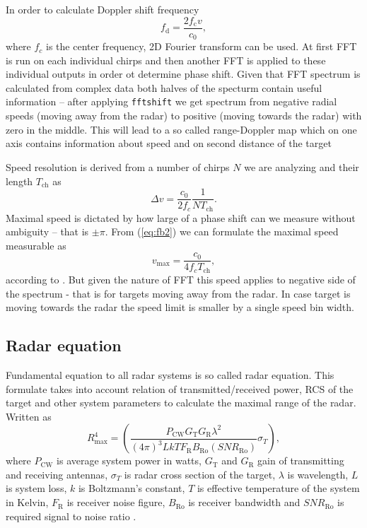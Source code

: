 In order to calculate Doppler shift frequency
\begin{equation}
  f_\mathrm{d} = \frac{2f_\mathrm{c}v}{c_0},
  \label{eq:Doppler2}
\end{equation}
where $f_c$ is the center frequency, 2D Fourier transform can be used.
At first FFT is run on each individual chirps and then another FFT is applied to these individual outputs in order ot determine phase shift.
Given that FFT spectrum is calculated from complex data both halves of the specturm contain useful information -- after applying \verb|fftshift| we get spectrum from negative radial speeds (moving away from the radar) to positive (moving towards the radar) with zero in the middle.
This will lead to a so called range-Doppler map which on one axis contains information about speed and on second distance of the target \cite{suleymanov2016}

Speed resolution is derived from a number of chirps $N$ we are analyzing and their length $T_{\mathrm{ch}}$ as
\begin{equation}
  \Delta v = \frac{c_0}{2f_c} \frac{1}{NT_{\mathrm{ch}}}.
  \label{eq:Doppler3}
\end{equation}
Maximal speed is dictated by how large of a phase shift can we measure without ambiguity -- that is $\pm \pi$.
From (\ref{eq:fb2}) we can formulate the maximal speed measurable as
\[
  v_\mathrm{max} = \frac{c_0}{4f_c T_\mathrm{ch}},
\]
according to \cite{fmcwSpeed}.
But given the nature of FFT this speed applies to negative side of the spectrum - that is for targets moving away from the radar.
In case target is moving towards the radar the speed limit is smaller by a single speed bin width.

\subsection{Radar equation}

Fundamental equation to all radar systems is so called radar equation.
This formulate takes into account relation of transmitted/received power, RCS of the target and other system parameters to calculate the maximal range of the radar.
Written as
\begin{equation}
	R_\mathrm{max}^4 = \left(\frac{P_{\mathrm{CW}}G_\mathrm{T}G_\mathrm{R}\lambda^2}{(4\pi)^3 L k T F_\mathrm{R}B_\mathrm{Ro}(SNR_\mathrm{Ro})} \sigma_T\right),
	\label{eq:radar_eq}
\end{equation}
where $P_\mathrm{CW}$ is average system power in watts, $G_\mathrm{T}$ and $G_\mathrm{R}$ gain of transmitting and receiving antennas, $\sigma_T$ is radar cross section of the target, $\lambda$ is wavelength, $L$ is system loss, $k$ is Boltzmann's constant, $T$ is effective temperature of the system in Kelvin, $F_\mathrm{R}$ is receiver noise figure, $B_\mathrm{Ro}$ is receiver bandwidth and $SNR_\mathrm{Ro}$ is required signal to noise ratio \cite{jankiraman2018}.


